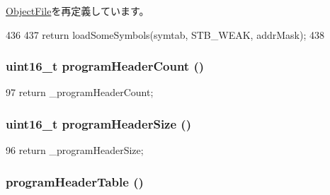 \hyperlink{classObjectFile_ad466ccc8c0bb76d0ff5a2e7e965a2200}{ObjectFile}を再定義しています。


\begin{DoxyCode}
436 {
437     return loadSomeSymbols(symtab, STB_WEAK, addrMask);
438 }
\end{DoxyCode}
\hypertarget{classElfObject_ac41b59a59e22c3f13e3b8377965610bb}{
\subsubsection[{programHeaderCount}]{\setlength{\rightskip}{0pt plus 5cm}uint16\_\-t programHeaderCount ()}}
\label{classElfObject_ac41b59a59e22c3f13e3b8377965610bb}



\begin{DoxyCode}
97 {return _programHeaderCount;}
\end{DoxyCode}
\hypertarget{classElfObject_afcbc87834539817b70011c024ab08e95}{
\subsubsection[{programHeaderSize}]{\setlength{\rightskip}{0pt plus 5cm}uint16\_\-t programHeaderSize ()}}
\label{classElfObject_afcbc87834539817b70011c024ab08e95}



\begin{DoxyCode}
96 {return _programHeaderSize;}
\end{DoxyCode}
\hypertarget{classElfObject_acccc82a035ebb35744fea52a2b39cad7}{
\subsubsection[{programHeaderTable}]{ programHeaderTable ()}}
\label{classElfObject_acccc82a035ebb35744fea52a2b39cad7}



